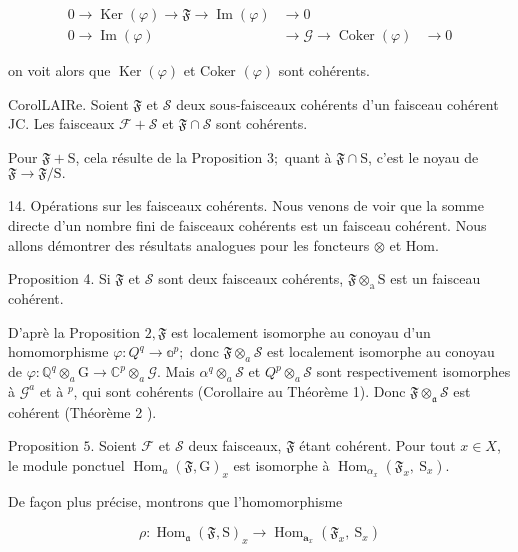 $$
\begin{aligned}
    0 \rightarrow \operatorname{Ker}(\varphi) \rightarrow \mathfrak{F} \rightarrow \operatorname{Im}(\varphi) & \rightarrow 0 \\
    0 \rightarrow \operatorname{Im}(\varphi) & \rightarrow \mathcal{G} \rightarrow \operatorname{Coker}(\varphi) & \rightarrow 0
\end{aligned}
$$

on voit alors que $\operatorname{Ker}(\varphi)$ et Coker $(\varphi)$ sont cohérents.

CorolLAIRe. Soient $\mathfrak{F}$ et $\mathcal{S}$ deux sous-faisceaux cohérents d'un faisceau cohérent JC. Les faisceaux $\mathcal{F}+\mathcal{S}$ et $\mathfrak{F} \cap \mathcal{S}$ sont cohérents.

Pour $\mathfrak{F}+\mathrm{S}$, cela résulte de la Proposition $3 ;$ quant à $\mathfrak{F} \cap \mathrm{S}$, c'est le noyau de $\mathfrak{F} \rightarrow \mathfrak{F} / \mathrm{S} .$

14. Opérations sur les faisceaux cohérents. Nous venons de voir que la somme directe d'un nombre fini de faisceaux cohérents est un faisceau cohérent. Nous allons démontrer des résultats analogues pour les foncteurs $\otimes$ et Hom.

Proposition 4. Si $\mathfrak{F}$ et $\mathcal{S}$ sont deux faisceaux cohérents, $\mathfrak{F} \otimes_{\mathrm{a}} \mathrm{S}$ est un faisceau cohérent.

D'aprè la Proposition $2, \mathfrak{F}$ est localement isomorphe au conoyau d'un homomorphisme $\varphi: Q^{q} \rightarrow \mathbb{a}^{p} ;$ donc $\mathfrak{F} \otimes_{a} \mathcal{S}$ est localement isomorphe au conoyau de $\varphi: \mathbb{Q}^{q} \otimes_{a} \mathrm{G} \rightarrow \mathbb{C}^{p} \otimes_{a} \mathcal{G} .$ Mais $\alpha^{q} \otimes_{a} \mathcal{S}$ et $Q^{p} \otimes_{a} \mathcal{S}$ sont respectivement isomorphes à $\mathcal{G}^{a}$ et à $\mathcal{}^{p}$, qui sont cohérents (Corollaire au Théorème 1). Donc $\mathfrak{F} \otimes_{\mathfrak{a}} \mathcal{S}$ est cohérent (Théorème 2 ).

Proposition $5 .$ Soient $\mathcal{F}$ et $\mathcal{S}$ deux faisceaux, $\mathfrak{F}$ étant cohérent. Pour tout $x \in X$, le module ponctuel $\operatorname{Hom}_{a}(\mathfrak{F}, \mathrm{G})_{x}$ est isomorphe à $\operatorname{Hom}_{\alpha_{x}}\left(\mathfrak{F}_{x}, \mathrm{~S}_{x}\right)$.

De façon plus précise, montrons que l'homomorphisme

$$
\rho: \operatorname{Hom}_{\mathfrak{a}}(\mathfrak{F}, \mathrm{S})_{x} \rightarrow \operatorname{Hom}_{\boldsymbol{a}_{x}}\left(\mathfrak{F}_{x}, \mathrm{~S}_{x}\right)
$$

